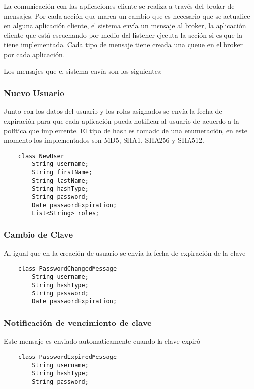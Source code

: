 La comunicación con las aplicaciones cliente se realiza a través del broker de mensajes.
Por cada acción que marca un cambio que es necesario que se actualice en alguna aplicación cliente, el sistema envía un mensaje al broker, la aplicación cliente que está escuchando por medio del listener ejecuta la acción si es que la tiene implementada.
Cada tipo de mensaje tiene creada una queue en el broker por cada aplicación. 

Los mensajes que el sistema envía son los siguientes:

\subsubsection{Nuevo Usuario}
Junto con los datos del usuario y los roles asignados se envía la fecha de expiración para que cada aplicación pueda notificar al usuario de acuerdo a la política que implemente.
El tipo de hash es tomado de una enumeración, en este momento los implementados son MD5, SHA1, SHA256 y SHA512.

  \begin{verbatim}
    class NewUser
        String username;
        String firstName;
        String lastName;
        String hashType;
        String password;
        Date passwordExpiration;
        List<String> roles;
  \end{verbatim}

\subsubsection{Cambio de Clave}
Al igual que en la creación de usuario se envía la fecha de expiración de la clave 

  \begin{verbatim}
    class PasswordChangedMessage    
        String username;
        String hashType;    
        String password;
        Date passwordExpiration;
  \end{verbatim}

\subsubsection{Notificación de vencimiento de clave}
Este mensaje es enviado automaticamente cuando la clave expiró

  \begin{verbatim}
    class PasswordExpiredMessage
        String username;
        String hashType;    
        String password;
  \end{verbatim}

